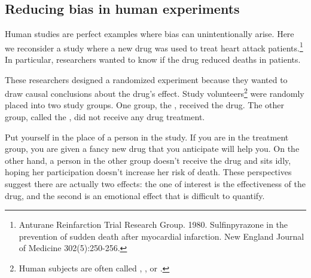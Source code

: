 
\subsection{Reducing bias in human experiments}
\label{biasInHumanExperiments}

  Human studies are perfect examples where bias can unintentionally arise. Here we reconsider a study where a new drug was used to treat heart attack patients.\footnote{Anturane Reinfarction Trial Research Group. 1980. Sulfinpyrazone in the prevention of sudden death after myocardial infarction. New England Journal of Medicine 302(5):250-256.} In particular, researchers wanted to know if the drug reduced deaths in patients.

These researchers designed a randomized experiment because they wanted to draw causal conclusions about the drug's effect. Study volunteers\footnote{Human subjects are often called , , or .} were randomly placed into two study groups. One group, the , received the drug. The other group, called the , did not receive any drug treatment. 

Put yourself in the place of a person in the study. If you are in the treatment group, you are given a fancy new drug that you anticipate will help you. On the other hand, a person in the other group doesn't receive the drug and sits idly, hoping her participation doesn't increase her risk of death. These perspectives suggest there are actually two effects: the one of interest is the effectiveness of the drug, and the second is an emotional effect that is difficult to quantify.

